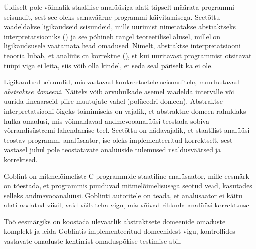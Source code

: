 \documentclass[../thesis.tex]{subfiles}
\begin{document}
Üldiselt pole võimalik staatilise analüüsiga alati täpselt määrata programmi seisundit, sest see oleks samaväärne programmi käivitamisega. Seetõttu vaadeldakse ligikaudseid seisundeid, mille uurimist nimetatakse abstraktseks interpretatsiooniks () ja see põhineb rangel teoreetilisel alusel, millel on ligikaudsusele vaatamata head omadused. Nimelt, abstraktse interpretatsiooni teooria lubab, et analüüs on korrektne (), st kui uuritavast programmist otsitavat tüüpi viga ei leita, siis võib olla kindel, et seda seal päriselt ka ei ole.

Ligikaudsed seisundid, mis vastavad konkreetsetele seisunditele, moodustavad \emph{abstraktse domeeni}. Näiteks võib arvuhulkade asemel vaadelda intervalle või uurida lineaarseid piire muutujate vahel (polüeedri domeen). Abstraktse interpretatsiooni õigeks toimimiseks on vajalik, et abstraktne domeen rahuldaks hulka omadusi, mis võimaldavad andmevooanalüüsi teostada sobiva võrrandisüsteemi lahendamise teel. Seetõttu on hädavajalik, et staatilist analüüsi teostav programm, analüsaator, ise oleks implementeeritud korrektselt, sest vastasel juhul pole teostatavate analüüside tulemused usaldusväärsed ja korrektsed.

Goblint on mitmelõimeliste C programmide staatiline analüsaator, mille eesmärk on tõestada, et programmis puuduvad mitmelõimelisusega seotud vead, kasutades selleks andmevooanalüüsi. Goblinti autoritele on teada, et analüsaator ei käitu alati oodatud viisil, vaid võib teha vigu, mis võivad rikkuda analüüsi korrektsuse.

\begin{comment}
Omaduspõhine testimine on testimismeetod, mis on sobib hästi programmi loogika matemaatiliste omaduse kontrollimiseks. Selleks kirjeldatakse kontrollitavad omadused predikaatidena ja neile juhuslike argumentide genereerimise metoodika. Nende kombineerimisel genereeritakse soovitud kogus juhuslike argumentide komplekte, millel leitakse predikaatide väärtused, kinnitades omaduse kehtimist või kummutades selle. Lisaks toetab omaduspõhise testimise raamistik leitud vääravate testjuhtude lihtsustamist.

\TODO{Siduda analüsaatori korrektsus omaduspõhise testimise kasutamisega}
\end{comment}

Töö eesmärgiks on koostada ülevaatlik abstraktsete domeenide omaduste komplekt ja leida Goblintis implementeeritud domeenidest vigu, kontrollides vastavate omaduste kehtimist omaduspõhise testimise abil.
\end{document}
